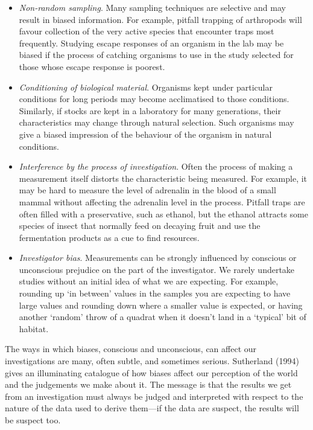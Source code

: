 \documentclass[
]{book}
\begin{document}
\begin{itemize}
\item
  \emph{Non-random sampling}. Many sampling techniques are selective and may result in biased information. For example, pitfall trapping of arthropods will favour collection of the very active species that encounter traps most frequently. Studying escape responses of an organism in the lab may be biased if the process of catching organisms to use in the study selected for those whose escape response is poorest.
\item
  \emph{Conditioning of biological material}. Organisms kept under particular conditions for long periods may become acclimatised to those conditions. Similarly, if stocks are kept in a laboratory for many generations, their characteristics may change through natural selection. Such organisms may give a biased impression of the behaviour of the organism in natural conditions.
\item
  \emph{Interference by the process of investigation}. Often the process of making a measurement itself distorts the characteristic being measured. For example, it may be hard to measure the level of adrenalin in the blood of a small mammal without affecting the adrenalin level in the process. Pitfall traps are often filled with a preservative, such as ethanol, but the ethanol attracts some species of insect that normally feed on decaying fruit and use the fermentation products as a cue to find resources.
\item
  \emph{Investigator bias}. Measurements can be strongly influenced by conscious or unconscious prejudice on the part of the investigator. We rarely undertake studies without an initial idea of what we are expecting. For example, rounding up `in between' values in the samples you are expecting to have large values and rounding down where a smaller value is expected, or having another `random' throw of a quadrat when it doesn't land in a `typical' bit of habitat.
\end{itemize}

The ways in which biases, conscious and unconscious, can affect our investigations are many, often subtle, and sometimes serious. Sutherland (1994) gives an illuminating catalogue of how biases affect our perception of the world and the judgements we make about it. The message is that the results we get from an investigation must always be judged and interpreted with respect to the nature of the data used to derive them---if the data are suspect, the results will be suspect too.
\end{document}
